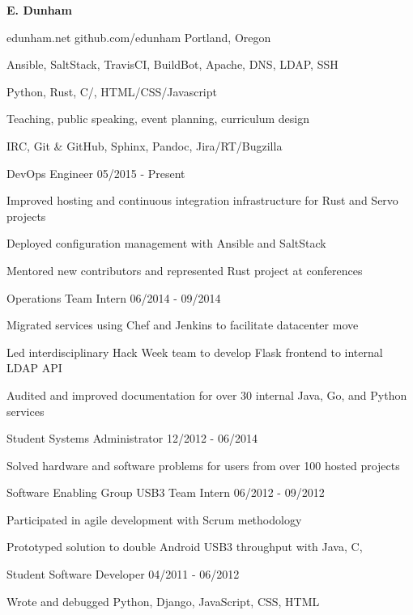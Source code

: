 \documentclass[11pt]{article} %
\begin{document}
\centerline{{\Huge \bf E. Dunham}}
\bigskip

        {edunham.net}
        {github.com/edunham}
        {Portland, Oregon}


      {Ansible, SaltStack, TravisCI, BuildBot, Apache, DNS, LDAP, SSH}

      {Python, Rust, C/\CPP, HTML/CSS/Javascript}

      {Teaching, public speaking, event planning, curriculum design}

      {IRC, Git \& GitHub, Sphinx, Pandoc, Jira/RT/Bugzilla}



\begin{description}
\squish
{}
           {DevOps Engineer}
           {05/2015 - Present}

Improved hosting and continuous integration infrastructure for Rust and Servo
projects

Deployed configuration management with Ansible and SaltStack

Mentored new contributors and represented Rust project at conferences

           {Operations Team Intern}
           {06/2014 - 09/2014}

Migrated services using Chef and Jenkins to facilitate datacenter move

Led interdisciplinary Hack Week team to develop Flask frontend to internal
LDAP API

Audited and improved documentation for over 30 internal Java, Go, and Python
services

           {Student Systems Administrator}
           {12/2012 - 06/2014}

Solved hardware and software problems for users from over 100 hosted projects

           {Software Enabling Group USB3 Team Intern}
           {06/2012 - 09/2012}

Participated in agile development with Scrum methodology

Prototyped solution to double Android USB3 throughput with Java, C, \CPP

           {Student Software Developer}
           {04/2011 - 06/2012}

Wrote and debugged Python, Django, JavaScript, CSS, HTML

\end{description}
\end{document}
